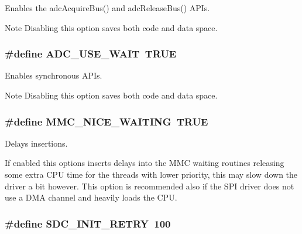 Enables the {\ttfamily adc\+Acquire\+Bus()} and {\ttfamily adc\+Release\+Bus()} A\+P\+Is. 

\begin{DoxyNote}{Note}
Disabling this option saves both code and data space. 
\end{DoxyNote}
\hypertarget{group__HAL__CONF_ga39e892a4090185fbdda9bb105bc03b4f}{
\subsubsection[{A\+D\+C\+\_\+\+U\+S\+E\+\_\+\+W\+A\+I\+T}]{\setlength{\rightskip}{0pt plus 5cm}\#define A\+D\+C\+\_\+\+U\+S\+E\+\_\+\+W\+A\+I\+T~T\+R\+U\+E}}\label{group__HAL__CONF_ga39e892a4090185fbdda9bb105bc03b4f}


Enables synchronous A\+P\+Is. 

\begin{DoxyNote}{Note}
Disabling this option saves both code and data space. 
\end{DoxyNote}
\hypertarget{group__HAL__CONF_ga3087dfffa81dd8a0a80ee92746e65fe2}{
\subsubsection[{M\+M\+C\+\_\+\+N\+I\+C\+E\+\_\+\+W\+A\+I\+T\+I\+N\+G}]{\setlength{\rightskip}{0pt plus 5cm}\#define M\+M\+C\+\_\+\+N\+I\+C\+E\+\_\+\+W\+A\+I\+T\+I\+N\+G~T\+R\+U\+E}}\label{group__HAL__CONF_ga3087dfffa81dd8a0a80ee92746e65fe2}


Delays insertions. 

If enabled this options inserts delays into the M\+M\+C waiting routines releasing some extra C\+P\+U time for the threads with lower priority, this may slow down the driver a bit however. This option is recommended also if the S\+P\+I driver does not use a D\+M\+A channel and heavily loads the C\+P\+U. \hypertarget{group__HAL__CONF_ga8d39f0c9799062f0698d97c26e6fa42d}{
\subsubsection[{S\+D\+C\+\_\+\+I\+N\+I\+T\+\_\+\+R\+E\+T\+R\+Y}]{\setlength{\rightskip}{0pt plus 5cm}\#define S\+D\+C\+\_\+\+I\+N\+I\+T\+\_\+\+R\+E\+T\+R\+Y~100}}\label{group__HAL__CONF_ga8d39f0c9799062f0698d97c26e6fa42d}


